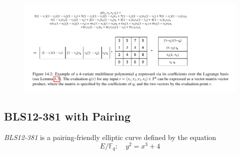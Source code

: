 \documentclass{article}
\begin{document}
\begin{figure}[h]
\centering
\includegraphics[scale=0.4]{eval-poly-2}
\end{figure} 

\newpage

\subsection{BLS12-381 with Pairing}

\textit{BLS12-381} is a pairing-friendly elliptic curve defined by the equation
\begin{equation*}
E /\mathbb{F}_q: \quad  y^2 = x^3 + 4
\end{equation*}
\end{document}
